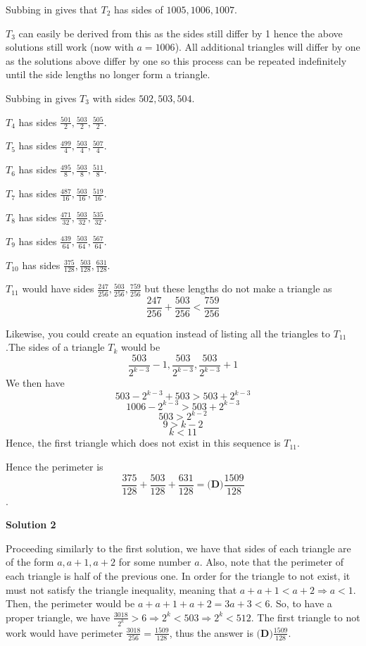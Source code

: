 \begin{enumerate}
 Subbing in gives that $T_2$ has sides of $1005, 1006, 1007$.

 $T_3$ can easily be derived from this as the sides still differ by 1 hence the above solutions still work (now with $a=1006$). All additional triangles will differ by one as the solutions above differ by one so this process can be repeated indefinitely until the side lengths no longer form a triangle.

 Subbing in gives $T_3$ with sides $502, 503, 504$.

 $T_4$ has sides $\frac{501}{2}, \frac{503}{2}, \frac{505}{2}$.

 $T_5$ has sides $\frac{499}{4}, \frac{503}{4}, \frac{507}{4}$.

 $T_6$ has sides $\frac{495}{8}, \frac{503}{8}, \frac{511}{8}$.

 $T_7$ has sides $\frac{487}{16}, \frac{503}{16}, \frac{519}{16}$.

 $T_8$ has sides $\frac{471}{32}, \frac{503}{32}, \frac{535}{32}$.

 $T_9$ has sides $\frac{439}{64}, \frac{503}{64}, \frac{567}{64}$.

 $T_{10}$ has sides $\frac{375}{128}, \frac{503}{128}, \frac{631}{128}$.

 $T_{11}$ would have sides $\frac{247}{256}, \frac{503}{256}, \frac{759}{256}$ but these lengths do not make a triangle as 
 \[\frac{247}{256} + \frac{503}{256} < \frac{759}{256}\]

 
Likewise, you could create an equation instead of listing all the triangles to $T_{11}$.The sides of a triangle $T_{k}$ would be 
 \[\frac{503}{2^{k-3}} - 1, \frac{503}{2^{k-3}}, \frac{503}{2^{k-3}} + 1\]We then have 
 \[503 - 2^{k-3} + 503 > 503 + 2^{k-3}\]
 \[1006 - 2^{k-3} > 503 + 2^{k-3}\]
 \[503 > 2^{k-2}\]
 \[9 > k-2\]
 \[k < 11\]Hence, the first triangle which does not exist in this sequence is $T_{11}$.

 Hence the perimeter is 
 \[\frac{375}{128} + \frac{503}{128} + \frac{631}{128} = \boxed{\textbf{(D)} \frac{1509}{128}}\].

 



\textbf{Solution 2}

Proceeding similarly to the first solution, we have that sides of each triangle are of the form $a, a+1, a+2$ for some number $a$. Also, note that the perimeter of each triangle is half of the previous one. In order for the triangle to not exist, it must not satisfy the triangle inequality, meaning that $a + a + 1 < a+2 \Rightarrow a<1$. Then, the perimeter would be $a + a + 1 + a + 2 = 3a + 3 < 6$. So, to have a proper triangle, we have $\frac{3018}{2^{k}} > 6 \Rightarrow 2^k < 503 \Rightarrow 2^{k} < 512$. The first triangle to not work would have perimeter $\frac{3018}{256} = \frac{1509}{128}$,  thus the answer is   $\boxed{\textbf{(D)} \frac{1509}{128}}$.


\end{enumerate}
